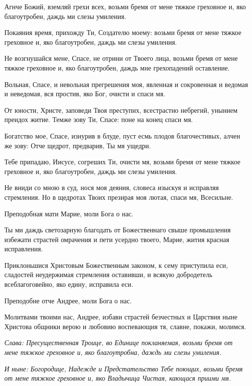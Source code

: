 Агнче Божий, вземляй грехи всех, возьми бремя от мене тяжкое греховное и, яко благоутробен, даждь ми слезы умиления.

Покаяния время, прихожду Ти, Создателю моему: возьми бремя от мене тяжкое греховное и, яко благоутробен, даждь ми слезы умиления.

Не возгнушайся мене, Спасе, не отрини от Твоего лица, возьми бремя от мене тяжкое греховное и, яко благоутробен, даждь мне грехопадений оставление.

Вольная, Спасе, и невольная прегрешения моя, явленная и сокровенная и ведомая и неведомая, вся простив, яко Бог, очисти и спаси мя.

От юности, Христе, заповеди Твоя преступих, всестрастно небрегий, унынием преидох житие. Темже зову Ти, Спасе: поне на конец спаси мя.

Богатство мое, Спасе, изнурив в блуде, пуст есмь плодов благочестивых, алчен же зову: Отче щедрот, предварив, Ты мя ущедри.

Тебе припадаю, Иисусе, согреших Ти, очисти мя, возьми бремя от мене тяжкое греховное и, яко благоутробен, даждь ми слезы умиления.

Не вниди со мною в суд, нося моя деяния, словеса изыскуя и исправляя стремления. Но в щедротах Твоих презирая моя лютая, спаси мя, Всесильне.


Преподобная мати Марие, моли Бога о нас.

Ты ми даждь светозарную благодать от Божественнаго свыше промышления избежати страстей омрачения и пети усердно твоего, Марие, жития красная исправления.


Приклоньшися Христовым Божественным законом, к сему приступила еси, сладостей неудержимая стремления оставивши, и всякую добродетель всеблагоговейно, яко едину, исправила еси.

Преподобне отче Андрее, моли Бога о нас.

Молитвами твоими нас, Андрее, избави страстей безчестных и Царствия ныне Христова общники верою и любовию воспевающия тя, славне, покажи, молимся.

\itshape Слава\normalfont{}: Пресущественная Троице, во Единице покланяемая, возьми бремя от мене тяжкое греховное и, яко благоутробна, даждь ми слезы умиления.

\itshape И ныне\normalfont{}: Богородице, Надежде и Предстательство Тебе поющих, возьми бремя от мене тяжкое греховное и, яко Владычица Чистая, кающася приими мя. 

